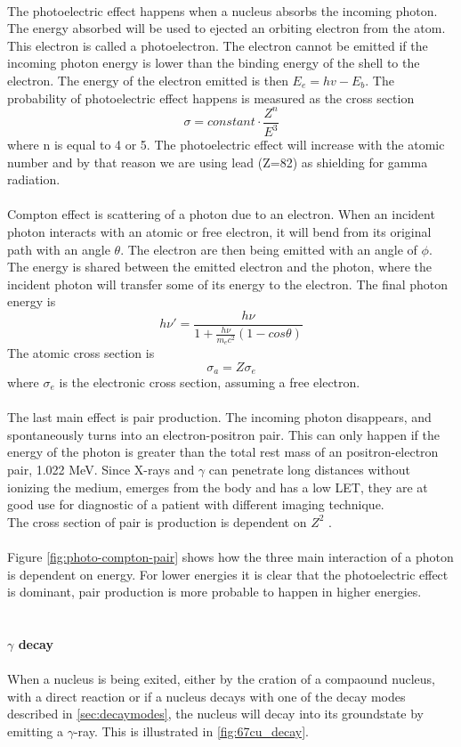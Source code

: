 \documentclass[twoside,english]{uiofysmaster/uiofysmaster}
\begin{document}
\\
The photoelectric effect happens when a nucleus absorbs the incoming photon. The energy absorbed will be used to ejected an orbiting electron from the atom. This electron is called a photoelectron\cite{nuclearchem}. The electron cannot be emitted if the incoming photon energy is lower than the binding energy of the shell to the electron. The energy of the electron emitted is then $E_e = hv - E_b$. The probability of photoelectric effect happens is measured as the cross section 
$$\sigma = constant \cdot \frac{Z^n}{E^3}$$
where n is equal to 4 or 5\cite{Radiological_physics}. The photoelectric effect will increase with the atomic number and by that reason we are using lead (Z=82) as shielding for gamma radiation.\\ 
\\
Compton effect is scattering of a photon due to an electron. When an incident photon interacts with an atomic or free electron, it will bend from its original path with an angle $\theta$. The electron are then being emitted with an angle of $\phi$.\\
The energy is shared between the emitted electron and the photon, where the incident photon will transfer some of its energy to the electron. The final photon energy is $$h\nu' = \frac{h\nu}{1 + \frac{h\nu}{m_ec^2} (1-cos\theta)}$$
The atomic cross section is $$\sigma_a = Z \sigma_e$$ where $\sigma_e$ is the electronic cross section, assuming a free electron\cite{nuclearchem}.\\
\\
The last main effect is pair production. The incoming photon disappears, and spontaneously turns into an electron-positron pair. This can only happen if the energy of the photon is greater than the total rest mass of an positron-electron pair, 1.022 MeV. Since X-rays and $\gamma$ can penetrate long distances without ionizing the medium, emerges from the body and has a low LET, they are at good use for diagnostic of a patient with different imaging technique. \\
The cross section of pair is production is dependent on $Z^2$ .
\\
\\
Figure \ref{fig:photo-compton-pair} shows how the three main interaction of a photon is dependent on energy. For lower energies it is clear that the photoelectric effect is dominant, pair production is more probable to happen in higher energies.\\
\\
\\
\textbf{$\gamma$ decay}
\\
\\
When a nucleus is being exited, either by the cration of a compaound nucleus, with a direct reaction or if a nucleus decays with one of the decay modes described in \ref{sec:decaymodes}, the nucleus will decay into its groundstate by emitting a $\gamma$-ray. This is illustrated in \ref{fig:67cu_decay}.
\end{document}
